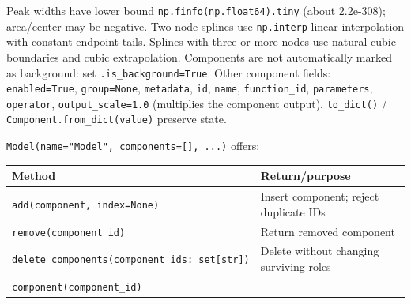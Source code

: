 \documentclass[
  10pt,
  a4paper,
  oneside]{scrreprt}
\begin{document}
Peak widths have lower bound \texttt{np.finfo(np.float64).tiny} (about
2.2e-308); area/center may be negative. Two-node splines use
\texttt{np.interp} linear interpolation with constant endpoint tails.
Splines with three or more nodes use natural cubic boundaries and cubic
extrapolation. Components are not automatically marked as background:
set \texttt{.is\_background=True}. Other component fields:
\texttt{enabled=True}, \texttt{group=None}, \texttt{metadata},
\texttt{id}, \texttt{name}, \texttt{function\_id}, \texttt{parameters},
\texttt{operator}, \texttt{output\_scale=1.0} (multiplies the component
output). \texttt{to\_dict()} / \texttt{Component.from\_dict(value)}
preserve state.

\texttt{Model(name="Model",\ components={[}{]},\ ...)} offers:

\begin{longtable}[]{@{}ll@{}}
\toprule
\begin{minipage}[b]{0.47\columnwidth}\raggedright
Method\strut
\end{minipage} & \begin{minipage}[b]{0.47\columnwidth}\raggedright
Return/purpose\strut
\end{minipage}\tabularnewline
\midrule
\endhead
\begin{minipage}[t]{0.47\columnwidth}\raggedright
\texttt{add(component,\ index=None)}\strut
\end{minipage} & \begin{minipage}[t]{0.47\columnwidth}\raggedright
Insert component; reject duplicate IDs\strut
\end{minipage}\tabularnewline
\begin{minipage}[t]{0.47\columnwidth}\raggedright
\texttt{remove(component\_id)}\strut
\end{minipage} & \begin{minipage}[t]{0.47\columnwidth}\raggedright
Return removed component\strut
\end{minipage}\tabularnewline
\begin{minipage}[t]{0.47\columnwidth}\raggedright
\texttt{delete\_components(component\_ids:\ set{[}str{]})}\strut
\end{minipage} & \begin{minipage}[t]{0.47\columnwidth}\raggedright
Delete without changing surviving roles\strut
\end{minipage}\tabularnewline
\begin{minipage}[t]{0.47\columnwidth}\raggedright
\texttt{component(component\_id)}\strut
\end{minipage} & \begin{minipage}[t]{0.47\columnwidth}\raggedright

\end{minipage}
\end{longtable}
\end{document}
